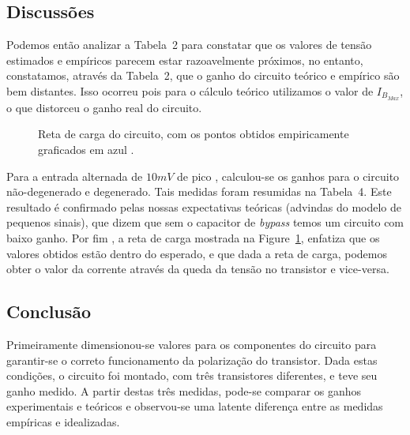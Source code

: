 \documentclass[12pt,a4paper]{article}
\begin{document}
\subsection{Discussões}
Podemos então analizar a Tabela~2 para constatar que os valores de tensão  estimados e  empíricos parecem estar 
razoavelmente próximos, no entanto, constatamos, através da Tabela~2, que o ganho do circuito 
teórico e empírico são bem distantes. Isso ocorreu pois para o cálculo teórico utilizamos o valor de $I_{B_{Max}}$,
o que distorceu o ganho real do circuito. 
\begin{figure}[htpb]
  \centering
  \caption{Reta de carga do circuito, com os pontos obtidos empiricamente graficados em azul .}
  \label{fig:carga}
\end{figure}
Para a entrada alternada de $10mV$ de pico , calculou-se os ganhos para o circuito não-degenerado e degenerado. Tais medidas foram
resumidas na Tabela~4. Este resultado é confirmado pelas nossas expectativas teóricas (advindas do modelo de pequenos sinais),
que dizem que sem o capacitor  de \emph{bypass} temos um circuito com baixo ganho.  Por fim , a reta de carga  mostrada na Figure~\ref{fig:carga}, enfatiza que os valores obtidos estão dentro do esperado, e 
que dada a reta de carga, podemos obter o valor da corrente através da queda da tensão no transistor e vice-versa.


\newpage
\subsection{Conclusão}
Primeiramente dimensionou-se  valores para os componentes do circuito para 
garantir-se o correto funcionamento da polarização do transistor. Dada estas 
condições, o circuito foi montado, com três transistores diferentes, e teve
seu ganho medido. A partir destas três medidas, pode-se comparar os ganhos
experimentais e teóricos e observou-se uma latente diferença entre as medidas 
empíricas e idealizadas.
\end{document}
